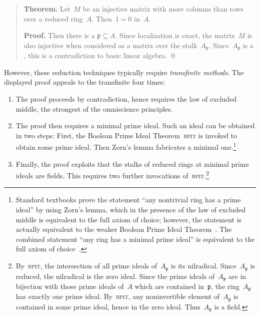 \documentclass{ws-rv9x6}
\newcommand{\ZZ}{\mathbb{Z}}
\newcommand{\ppp}{\mathfrak{p}}
\renewcommand{\_}{\mathpunct{.}}
\newcommand{\?}{\,{:}\,}
\newcommand{\BPIT}{\textsc{bpit}\xspace}
\begin{document}
\begin{quote}
\textbf{Theorem.} Let~$M$ be an injective matrix with more columns than rows
over a reduced ring~$A$. Then~$1 = 0$ in~$A$.

\textbf{Proof.}  Then there is a  $\ppp \subseteq A$. Since localization is exact, the matrix~$M$ is also injective when
considered as a matrix over the stalk~$A_\ppp$. Since~$A_\ppp$ is a
, this is a contradiction to basic linear algebra. \qed
\end{quote}

However, these reduction techniques typically require \emph{transfinite
methods}. The displayed proof appeals to the transfinite four times:
\begin{enumerate}
\item The proof proceeds by contradiction, hence requires the law of excluded
middle, the strongest of the omniscience principles.
\item The proof then requires a minimal prime ideal. Such an ideal can be
obtained in two steps: First, the Boolean Prime Ideal
Theorem~\BPIT is invoked to obtain some prime ideal. Then
Zorn's lemma fabricates a minimal one.\footnote{Standard textbooks prove the statement ``any nontrivial
ring has a prime ideal'' by using Zorn's lemma, which
in the presence of the law of excluded middle is equivalent to the full axiom
of choice; however, the statement is actually equivalent to the weaker Boolean
Prime Ideal Theorem~\cite{scott:bpit,banaschewski-harting:lattice-aspects}.
The combined statement ``any ring has a minimal prime ideal'' is equivalent to
the full axiom of choice~\cite{savin:minimal-prime-ideals}.}
\item Finally, the proof exploits that the stalks of reduced rings at minimal
prime ideals are fields. This requires two further invocations
of~\BPIT.\footnote{By~\BPIT, the intersection of all prime ideals of~$A_\ppp$
is its nilradical. Since~$A_\ppp$ is reduced, the nilradical is the zero ideal.
Since the prime ideals of~$A_\ppp$ are in bijection with those prime ideals
of~$A$ which are contained in~$\ppp$, the ring~$A_\ppp$ has exactly one prime
ideal. By~\BPIT, any noninvertible element of~$A_\ppp$ is contained in some
prime ideal, hence in the zero ideal. Thus~$A_\ppp$ is a field.}
\end{enumerate}
\end{document}
